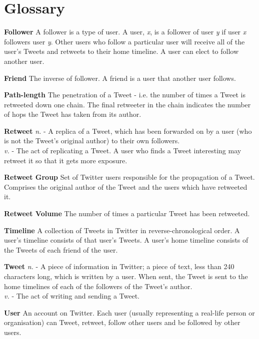 \chapter*{Glossary} 

{\bf Follower}
A follower is a type of user. A user, \textit{x}, is a follower of user \textit{y} if user \textit{x} followers user \textit{y}. Other users who follow a particular user will receive all of the user's Tweets and retweets to their home timeline. A user can elect to follow another user.

{\bf Friend}
The inverse of follower. A friend is a user that another user follows.

{\bf Path-length}
The penetration of a Tweet - i.e. the number of times a Tweet is retweeted down one chain. The final retweeter in the chain indicates the number of hops the Tweet has taken from its author.
			
{\bf Retweet}
\textit{n.} - A replica of a Tweet, which has been forwarded on by a user (who is not the Tweet's original author) to their own followers. \\
\textit{v.} - The act of replicating a Tweet. A user who finds a Tweet interesting may retweet it so that it gets more exposure.
									
{\bf Retweet Group}
Set of Twitter users responsible for the propagation of a Tweet. Comprises the original author of the Tweet and the users which have retweeted it.

{\bf Retweet Volume}
The number of times a particular Tweet has been retweeted.

{\bf Timeline}
A collection of Tweets in Twitter in reverse-chronological order. A user's timeline consists of that user's Tweets. A user's home timeline consists of the Tweets of each friend of the user.

{\bf Tweet}
\textit{n.} - A piece of information in Twitter; a piece of text, less than 240 characters long, which is written by a user. When sent, the Tweet is sent to the home timelines of each of the followers of the Tweet's author.\\
\textit{v.} - The act of writing and sending a Tweet.

{\bf User}
An account on Twitter. Each user (usually representing a real-life person or organisation) can Tweet, retweet, follow other users and be followed by other users.